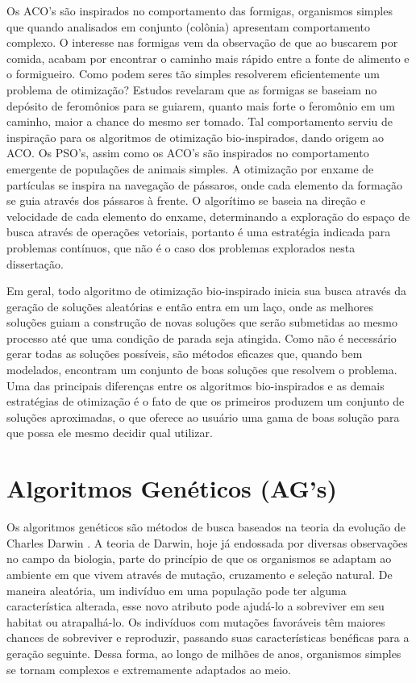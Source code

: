 Os ACO's são inspirados no comportamento das formigas, organismos simples que quando analisados em conjunto (colônia) apresentam comportamento complexo. O interesse nas formigas vem da observação de que ao buscarem por comida, acabam por encontrar o caminho mais rápido entre a fonte de alimento e o formigueiro. Como podem seres tão simples resolverem eficientemente um problema de otimização? Estudos revelaram que as formigas se baseiam no depósito de feromônios para se guiarem, quanto mais forte o feromônio em um caminho, maior a chance do mesmo ser tomado. Tal comportamento serviu de inspiração para os algoritmos de otimização bio-inspirados, dando origem ao \ac{ACO}. Os PSO's, assim como os ACO's são inspirados no comportamento emergente de populações de animais simples. A otimização por enxame de partículas se inspira na navegação de pássaros, onde cada elemento da formação se guia através dos pássaros à frente. O algorítimo se baseia na direção e velocidade de cada elemento do enxame, determinando a exploração do espaço de busca através de operações vetoriais, portanto é uma estratégia indicada para problemas contínuos, que não é o caso dos problemas explorados nesta dissertação.

Em geral, todo algoritmo de otimização bio-inspirado inicia sua busca através da geração de soluções aleatórias e então entra em um laço, onde as melhores soluções guiam a construção de novas soluções que serão submetidas ao mesmo processo até que uma condição de parada seja atingida. Como não é necessário gerar todas as soluções possíveis, são métodos eficazes que, quando bem modelados, encontram um conjunto de boas soluções que resolvem o problema. Uma das principais diferenças entre os algoritmos bio-inspirados e as demais estratégias de otimização é o fato de que os primeiros produzem um conjunto de soluções aproximadas, o que oferece ao usuário uma gama de boas solução para que possa ele mesmo decidir qual utilizar.

\section{Algoritmos Genéticos (AG's)}
\label{section_ag}
Os algoritmos genéticos são métodos de busca baseados na teoria da evolução de Charles Darwin \cite{Darwin1859}. A teoria de Darwin, hoje já endossada por diversas observações no campo da biologia, parte do princípio de que os organismos se adaptam ao ambiente em que vivem através de mutação, cruzamento e seleção natural. De maneira aleatória, um indivíduo em uma população pode ter alguma característica alterada, esse novo atributo pode ajudá-lo a sobreviver em seu habitat ou atrapalhá-lo. Os indivíduos com mutações favoráveis têm maiores chances de sobreviver e reproduzir, passando suas características benéficas para a geração seguinte. Dessa forma, ao longo de milhões de anos, organismos simples se tornam complexos e extremamente adaptados ao meio.

